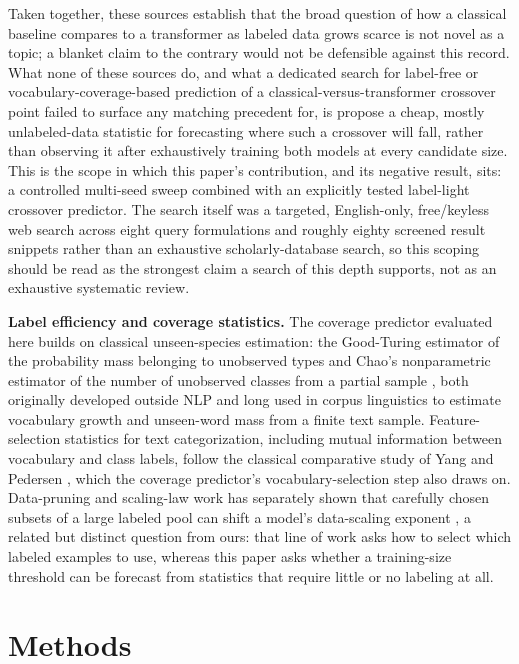 \documentclass[11pt,letterpaper]{article}
\begin{document}
Taken together, these sources establish that the broad question of how a classical baseline compares to a transformer as labeled data grows scarce is not novel as a topic; a blanket claim to the contrary would not be defensible against this record. What none of these sources do, and what a dedicated search for label-free or vocabulary-coverage-based prediction of a classical-versus-transformer crossover point failed to surface any matching precedent for, is propose a cheap, mostly unlabeled-data statistic for forecasting where such a crossover will fall, rather than observing it after exhaustively training both models at every candidate size. This is the scope in which this paper's contribution, and its negative result, sits: a controlled multi-seed sweep combined with an explicitly tested label-light crossover predictor. The search itself was a targeted, English-only, free/keyless web search across eight query formulations and roughly eighty screened result snippets rather than an exhaustive scholarly-database search, so this scoping should be read as the strongest claim a search of this depth supports, not as an exhaustive systematic review.

\textbf{Label efficiency and coverage statistics.} The coverage predictor evaluated here builds on classical unseen-species estimation: the Good-Turing estimator of the probability mass belonging to unobserved types \citep{Good1953,GaleSampson1995} and Chao's nonparametric estimator of the number of unobserved classes from a partial sample \citep{Chao1984}, both originally developed outside NLP and long used in corpus linguistics to estimate vocabulary growth and unseen-word mass from a finite text sample. Feature-selection statistics for text categorization, including mutual information between vocabulary and class labels, follow the classical comparative study of Yang and Pedersen \citep{YangPedersen1997}, which the coverage predictor's vocabulary-selection step also draws on. Data-pruning and scaling-law work has separately shown that carefully chosen subsets of a large labeled pool can shift a model's data-scaling exponent \citep{Sorscher2022}, a related but distinct question from ours: that line of work asks how to select which labeled examples to use, whereas this paper asks whether a training-size threshold can be forecast from statistics that require little or no labeling at all.

\section{Methods}
\end{document}

